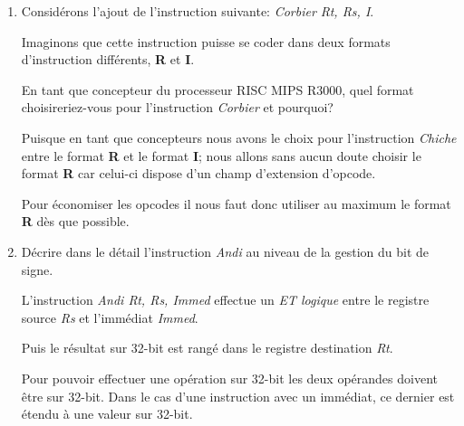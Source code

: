 {\begin{enumerate}
    \begin{correction}

      La loi d'Amdhal est utilis\'ee par les concepteurs de microprocesseurs
      pour choisir correctement les instructions \`a inclure dans le
      jeu d'instructions du processeur.

      Cette loi dit que le gain r\'eel li\'e \`a l'inclusion d'une instruction
      est relatif \`a son temps d'ex\'ecution mais \'egalement au
      taux d'utilisation de cette m\^eme instruction.

    \end{correction}
  \item
    Consid\'erons l'ajout de l'instruction suivante:
    \textit{Corbier Rt, Rs, I}.

    Imaginons que cette instruction puisse se coder dans deux formats
    d'instruction diff\'erents, \textbf{R} et \textbf{I}.

    En tant que concepteur du processeur RISC MIPS R3000, quel
    format choisireriez-vous pour l'instruction \textit{Corbier} et pourquoi?

    \begin{correction}

      Puisque en tant que concepteurs nous avons le choix pour l'instruction
      \textit{Chiche} entre le format \textbf{R} et le format \textbf{I};
      nous allons sans aucun doute choisir le format \textbf{R} car celui-ci
      dispose d'un champ d'extension d'opcode.

      Pour \'economiser les opcodes il nous faut donc utiliser au maximum
      le format \textbf{R} d\`es que possible.

    \end{correction}
  \item
    D\'ecrire dans le d\'etail l'instruction \textit{Andi} au niveau de la
    gestion du bit de signe.

    \begin{correction}

      L'instruction \textit{Andi Rt, Rs, Immed} effectue un \textit{ET logique}
      entre le registre source \textit{Rs} et l'imm\'ediat \textit{Immed}.

      Puis le r\'esultat sur 32-bit est rang\'e dans le registre destination
      \textit{Rt}.

      Pour pouvoir effectuer une op\'eration sur 32-bit les deux op\'erandes
      doivent \^etre sur 32-bit. Dans le cas d'une instruction avec
      un imm\'ediat, ce dernier est \'etendu \`a une valeur sur 32-bit.


\end{correction}
\end{enumerate}}
